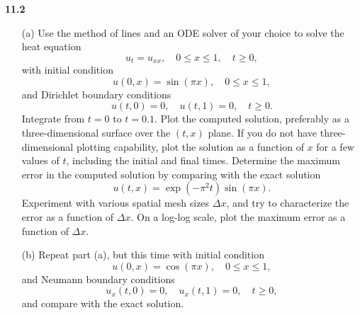 \textbf{11.2}
\begin{itemize}
\item[(a)]
  Use the method of lines and an ODE solver of your choice to solve the heat equation
  \begin{displaymath}
    u_t = u_{xx}, \quad 0\le x \le 1, \quad t\ge 0,
  \end{displaymath}
  with initial condition
  \begin{displaymath}
    u(0, x) = \sin(\pi x), \quad 0\le x \le 1,
  \end{displaymath}
  and Dirichlet boundary conditions
  \begin{displaymath}
    u(t, 0) = 0, \quad u(t, 1) = 0, \quad t\ge 0.
  \end{displaymath}
  Integrate from $t=0$ to $t=0.1$.
  Plot the computed solution,
  preferably as a three-dimensional surface over the $(t, x)$ plane.
  If you do not have three-dimensional plotting capability,
  plot the solution as a function of $x$ for a few values of $t$,
  including the initial and final times.
  Determine the maximum error in the computed solution by
  comparing with the exact solution
  \begin{displaymath}
    u(t, x) = \exp(-\pi^2t)\sin(\pi x).
  \end{displaymath}
  Experiment with various spatial mesh sizes $\Delta x$,
  and try to characterize the error as a function of $\Delta x$.
  On a log-log scale,
  plot the maximum error as a function of $\Delta x$.

\item[(b)]
  Repeat part (a),
  but this time with initial condition
  \begin{displaymath}
    u(0, x) = \cos(\pi x), \quad 0\le x \le 1,
  \end{displaymath}
  and Neumann boundary conditions
  \begin{displaymath}
    u_x(t, 0) = 0, \quad u_x(t, 1) = 0, \quad t\ge 0,
  \end{displaymath}
  and compare with the exact solution.
\end{itemize}
